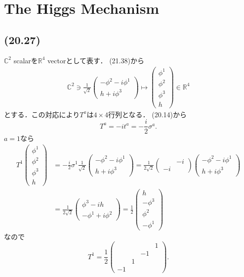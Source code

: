 \section{The Higgs Mechanism}
\subsection{(20.27)}
\(\mathbb{C}^2\) scalarを\(\mathbb{R}^4\) vectorとして表す．
(21.38)から
\begin{align}
  \mathbb{C}^2 \ni
  \frac{1}{\sqrt{2}}
  \begin{pmatrix}
    -\phi^2 - i \phi^1 \\
    h + i\phi^3
  \end{pmatrix}
  \mapsto
  \begin{pmatrix}
    \phi^1 \\ \phi^2 \\ \phi^3 \\ h
  \end{pmatrix}
  \in \mathbb{R}^4
  \label{20_27_C2toR4}
\end{align}
とする．この対応により\(T^a\)は\(4\times4\)行列となる．
(20.14)から
\[ T^a = -i t^a = - \frac{i}{2} \sigma^a . \]
\(a=1\)なら
\begin{align*}
  T^1
  \begin{pmatrix}
    \phi^1 \\ \phi^2 \\ \phi^3 \\ h
  \end{pmatrix}
  &= - \frac{i}{2} \sigma^1
  \frac{1}{\sqrt{2}}
  \begin{pmatrix}
    -\phi^2 - i \phi^1 \\
    h + i\phi^3
  \end{pmatrix}
  = \frac{1}{2\sqrt{2}}
  \begin{pmatrix}
    & -i \\ -i &
  \end{pmatrix}
  \begin{pmatrix}
    -\phi^2 - i \phi^1 \\
    h + i\phi^3
  \end{pmatrix}
  \\
  &= \frac{1}{2\sqrt{2}}
  \begin{pmatrix}
    \phi^3 - ih \\
    -\phi^1 + i \phi^2
  \end{pmatrix}
  = \frac{1}{2}
  \begin{pmatrix}
    h \\ -\phi^3 \\ \phi^2 \\ -\phi^1
  \end{pmatrix}
\end{align*}
なので
\[
T^1 = \frac{1}{2}
\begin{pmatrix}
  & & & 1 \\ & & -1 & \\ & 1 & & \\ -1 & & &
\end{pmatrix}
.
\]

